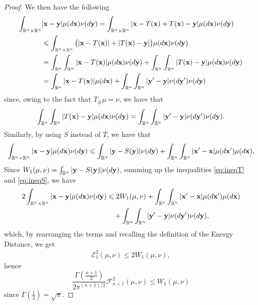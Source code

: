 \documentclass[10pt,a4paper]{amsart}
\def\bx{{\bf x}}
\def\by{{\bf y}}
\def \erre{\mathbb{R}}
\renewcommand{\le}{\leqslant}
\begin{document}
\begin{proof}
    We then have the following 
    \begin{align}
    \label{eq:ineqT}
        \nonumber\int_{\erre^n\times\erre^n}&|\bx-\by|\mu(d\bx)\nu(d\by)=\int_{\erre^n\times\erre^n}|\bx-T(\bx)+T(\bx)-\by|\mu(d\bx)\nu(d\by)\\
        \nonumber&\le \int_{\erre^n\times\erre^n}\big(|\bx-T(\bx)|+|T(\bx)-\by|\big)\mu(d\bx)\nu(d\by)\\
        \nonumber&=\int_{\erre^n}\int_{\erre^n}|\bx-T(\bx)|\mu(d\bx)\nu(d\by)+\int_{\erre^n}\int_{\erre^n}|T(\bx)-\by|\mu(d\bx)\nu(d\by)\\
        &=\int_{\erre^n}|\bx-T(\bx)|\mu(d\bx)+\int_{\erre^n}\int_{\erre^n}|\by'-\by|\nu(d\by')\nu(d\by)
    \end{align}
    since, owing to the fact that $T_\#\mu=\nu$, we have that 
    \begin{equation}
        \int_{\erre^n}\int_{\erre^n}|T(\bx)-\by|\mu(d\bx)\nu(d\by)=\int_{\erre^n}\int_{\erre^n}|\by'-\by|\nu(d\by')\nu(d\by).
    \end{equation}
    Similarly, by using $S$ instead of $T$, we have that
    \begin{equation}
        \label{eq:ineqS}
        \int_{\erre^n\times\erre^n}|\bx-\by|\mu(d\bx)\nu(d\by)\le \int_{\erre^n}|\by-S(\by)|\nu(d\by)+\int_{\erre^n}\int_{\erre^n}|\bx'-\bx|\mu(d\bx')\mu(d\bx),    
    \end{equation}
    Since $W_1(\mu,\nu)=\int_{\erre^n}|\by-S(\by)|\nu(d\by)$, summing up the inequalities \eqref{eq:ineqT} and \eqref{eq:ineqS}, we have
    \begin{align}
        \label{eq:ineq_tot}
        \nonumber2\int_{\erre^n\times\erre^n}|\bx-\by|\mu(d\bx)\nu(d\by)&\le 2W_1(\mu,\nu)+\int_{\erre^n}\int_{\erre^n}|\bx'-\bx|\mu(d\bx')\mu(d\bx)\\
        &\quad+ \int_{\erre^n}\int_{\erre^n}|\by'-\by|\nu(d\by')\nu(d\by),
    \end{align}
    which, by rearranging the terms and recalling the definition of the Energy Distance, we get
    \begin{align}
        \mathcal{E}_1^2(\mu,\nu)\le 2W_1(\mu,\nu),
    \end{align}
    hence
    \begin{equation}
        \frac{\Gamma\left(\frac{n+1}2\right)}{2\pi^{(n+1)/2}}\mathcal{F}^2_{n+1}(\mu,\nu)\le W_1(\mu,\nu)
    \end{equation}
    since $\Gamma(\frac{1}{2})=\sqrt{\pi}$.
\end{proof}
\end{document}
